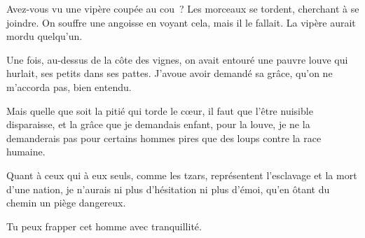 \documentclass[french,twoside]{book} %
\begin{document}
Avez-vous vu une vipère coupée au cou ? Les morceaux se tordent, cherchant à se joindre. On souffre une angoisse en voyant cela, mais il le fallait. La vipère aurait mordu quelqu’un.\par
Une fois, au-dessus de la côte des vignes, on avait entouré une pauvre louve qui hurlait, ses petits dans ses pattes. J’avoue avoir demandé sa grâce, qu’on ne m’accorda pas, bien entendu.\par
Mais quelle que soit la pitié qui torde le cœur, il faut que l’être nuisible disparaisse, et la grâce que je demandais enfant, pour la louve, je ne la demanderais pas pour certains hommes pires que des loups contre la race humaine.\par
Quant à ceux qui à eux seuls, comme les tzars, représentent l’esclavage et la mort d’une nation, je n’aurais ni plus d’hésitation ni plus d’émoi, qu’en ôtant du chemin un piège dangereux.\par

Tu peux frapper cet homme avec tranquillité.\\
\end{document}

